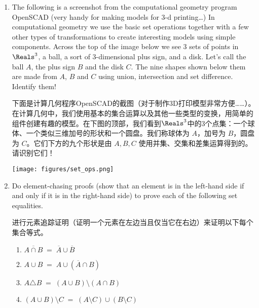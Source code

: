 \begin{enumerate}
  \vfill
  
  
  \pagebreak
  
  \item The following is a screenshot from the computational geometry program OpenSCAD (very handy for making models 
  for 3-d printing\ldots)  In computational geometry we use the basic set operations together
  with a few other types of transformations to create interesting models using simple components.
  Across the top of the image below we see 3 sets of points in $\Reals^3$, a ball, a sort of 3-dimensional plus sign, and a disk.
  Let's call the ball $A$, the plus sign $B$ and the disk $C$.
  The nine shapes shown below them are made from $A$, $B$ and $C$ using union, intersection and set difference.
  Identify them!
  
  下面是计算几何程序OpenSCAD的截图（对于制作3D打印模型非常方便……）。在计算几何中，我们使用基本的集合运算以及其他一些类型的变换，用简单的组件创建有趣的模型。在下图的顶部，我们看到$\Reals^3$中的3个点集：一个球体、一个类似三维加号的形状和一个圆盘。我们称球体为 $A$，加号为 $B$，圆盘为 $C$。它们下方的九个形状是由 $A, B, C$ 使用并集、交集和差集运算得到的。请识别它们！
  
  \vspace{.5in}
  \texttt{[image: figures/set\_ops.png]}
  
  \pagebreak
  
  \item Do element-chasing proofs (show that an element is in the left-hand side if and only if it is in the right-hand side) to prove each of the following set equalities.
  
  进行元素追踪证明（证明一个元素在左边当且仅当它在右边）来证明以下每个集合等式。
  \begin{enumerate}
    \item \wbitemsep$\overline{A\cap B} \; = \; \overline{A}\cup\overline{B}$
  
    \item \wbitemsep$A\cup B \; = \; A\cup(\overline{A}\cap B)$
  
    \item \wbitemsep$A\triangle B \; = \; (A\cup B)\setminus(A\cap B)$
  
    \item \wbitemsep$(A\cup B)\setminus C \; = \; (A\setminus C)\cup(B\setminus C)$
  
    \end{enumerate}
  

\end{enumerate}
